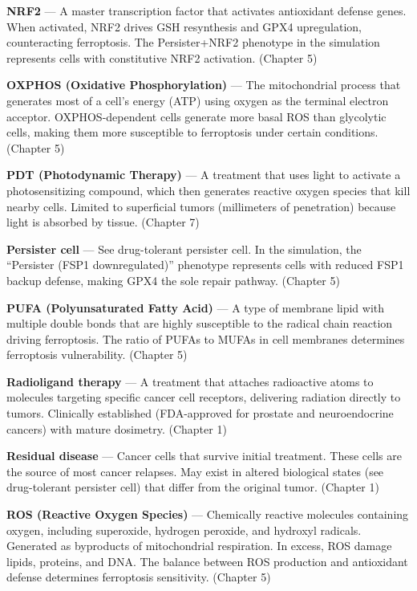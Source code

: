 \documentclass[11pt,twoside,openright]{report}
\begin{document}
\textbf{NRF2} --- A master transcription factor that activates antioxidant defense genes. When activated, NRF2 drives GSH resynthesis and GPX4 upregulation, counteracting ferroptosis. The Persister+NRF2 phenotype in the simulation represents cells with constitutive NRF2 activation. (Chapter 5)

\textbf{OXPHOS (Oxidative Phosphorylation)} --- The mitochondrial process that generates most of a cell's energy (ATP) using oxygen as the terminal electron acceptor. OXPHOS-dependent cells generate more basal ROS than glycolytic cells, making them more susceptible to ferroptosis under certain conditions. (Chapter 5)

\textbf{PDT (Photodynamic Therapy)} --- A treatment that uses light to activate a photosensitizing compound, which then generates reactive oxygen species that kill nearby cells. Limited to superficial tumors (millimeters of penetration) because light is absorbed by tissue. (Chapter 7)

\textbf{Persister cell} --- See drug-tolerant persister cell. In the simulation, the ``Persister (FSP1 downregulated)'' phenotype represents cells with reduced FSP1 backup defense, making GPX4 the sole repair pathway. (Chapter 5)

\textbf{PUFA (Polyunsaturated Fatty Acid)} --- A type of membrane lipid with multiple double bonds that are highly susceptible to the radical chain reaction driving ferroptosis. The ratio of PUFAs to MUFAs in cell membranes determines ferroptosis vulnerability. (Chapter 5)

\textbf{Radioligand therapy} --- A treatment that attaches radioactive atoms to molecules targeting specific cancer cell receptors, delivering radiation directly to tumors. Clinically established (FDA-approved for prostate and neuroendocrine cancers) with mature dosimetry. (Chapter 1)

\textbf{Residual disease} --- Cancer cells that survive initial treatment. These cells are the source of most cancer relapses. May exist in altered biological states (see drug-tolerant persister cell) that differ from the original tumor. (Chapter 1)

\textbf{ROS (Reactive Oxygen Species)} --- Chemically reactive molecules containing oxygen, including superoxide, hydrogen peroxide, and hydroxyl radicals. Generated as byproducts of mitochondrial respiration. In excess, ROS damage lipids, proteins, and DNA. The balance between ROS production and antioxidant defense determines ferroptosis sensitivity. (Chapter 5)
\end{document}
